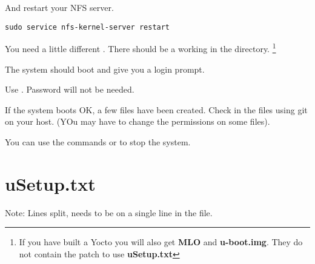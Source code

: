 And restart your NFS server.

\begin{verbatim}
sudo service nfs-kernel-server restart
\end{verbatim}

You need a little different . There should be a working 
in the  directory. \footnote{If you have built a
Yocto you will also get {\bf MLO} and {\bf u-boot.img}. They do not contain the patch to use {\bf uSetup.txt}}

The system should boot and give you a login prompt.

Use . Password will not be needed.

If the system boots OK, a few files have been created.
Check in the files using git on your host. (YOu may have to change the permissions on some files).

You can use the commands  or  to stop the system.

\clearpage
\section{uSetup.txt}

Note: Lines split, needs to be on a single line in the file.

